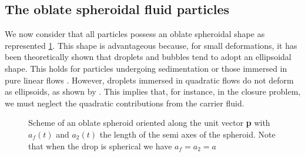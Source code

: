 \subsection{The oblate spheroidal fluid particles}


We now consider that all particles possess an oblate spheroidal shape as represented \ref{fig:scheme_spheroid}. 
This shape is advantageous because, for small deformations, it has been theoretically shown that droplets and bubbles tend to adopt an ellipsoidal shape. 
This holds for particles undergoing sedimentation \citep{taylor1964deformation} or those immersed in pure linear flows \citet{leal2007advanced}. 
However, droplets immersed in quadratic flows do not deform as ellipsoids, as shown by \citet{nadim1991motion}. 
This implies that, for instance, in the closure problem, we must neglect the quadratic contributions from the carrier fluid. 
\begin{figure}[h!]
    \centering
    \hfill
    \hfill
    \caption{Scheme of an  oblate spheroid oriented along the unit vector \textbf{p} with $a_f(t)$ and $a_2(t)$ the length of the semi axes of the spheroid.
    Note that when the drop is spherical we have $a_f=a_2=a$}
    \label{fig:scheme_spheroid}
\end{figure}

